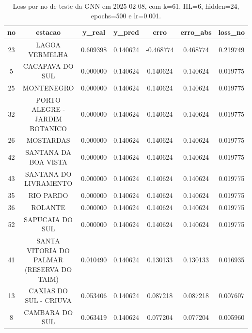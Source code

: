 \begin{table}[h]
\centering
\caption{Loss por no de teste da GNN em 2025-02-08, com k=61, HL=6, hidden=24, epochs=500 e lr=0.001.}
\label{tab:gnn_loss_k61_hl6_h24_e500_d20250208}
\begin{tabular}{ccccccc}
\toprule
no & estacao & y\_real & y\_pred & erro & erro\_abs & loss\_no \\
\midrule
23 & LAGOA VERMELHA & 0.609398 & 0.140624 & -0.468774 & 0.468774 & 0.219749 \\
5 & CACAPAVA DO SUL & 0.000000 & 0.140624 & 0.140624 & 0.140624 & 0.019775 \\
25 & MONTENEGRO & 0.000000 & 0.140624 & 0.140624 & 0.140624 & 0.019775 \\
32 & PORTO ALEGRE - JARDIM BOTANICO & 0.000000 & 0.140624 & 0.140624 & 0.140624 & 0.019775 \\
26 & MOSTARDAS & 0.000000 & 0.140624 & 0.140624 & 0.140624 & 0.019775 \\
42 & SANTANA DA BOA VISTA & 0.000000 & 0.140624 & 0.140624 & 0.140624 & 0.019775 \\
43 & SANTANA DO LIVRAMENTO & 0.000000 & 0.140624 & 0.140624 & 0.140624 & 0.019775 \\
35 & RIO PARDO & 0.000000 & 0.140624 & 0.140624 & 0.140624 & 0.019775 \\
36 & ROLANTE & 0.000000 & 0.140624 & 0.140624 & 0.140624 & 0.019775 \\
52 & SAPUCAIA DO SUL & 0.000000 & 0.140624 & 0.140624 & 0.140624 & 0.019775 \\
41 & SANTA VITORIA DO PALMAR (RESERVA DO TAIM) & 0.010490 & 0.140624 & 0.130133 & 0.130133 & 0.016935 \\
13 & CAXIAS DO SUL - CRIUVA & 0.053406 & 0.140624 & 0.087218 & 0.087218 & 0.007607 \\
8 & CAMBARA DO SUL & 0.063419 & 0.140624 & 0.077204 & 0.077204 & 0.005960 \\
\bottomrule
\end{tabular}
\end{table}
